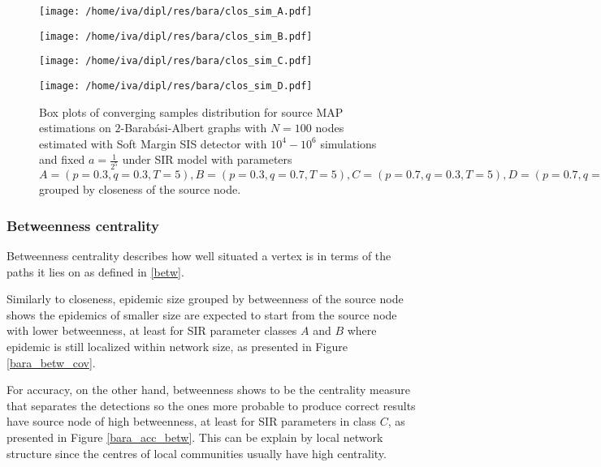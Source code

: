 \documentclass[times, utf8, diplomski]{fer}
\begin{document}
\begin{figure}[H]
\begin{minipage}{0.5\textwidth}
\texttt{[image: /home/iva/dipl/res/bara/clos\_sim\_A.pdf]}
\end{minipage}
\begin{minipage}{0.5\textwidth}
\texttt{[image: /home/iva/dipl/res/bara/clos\_sim\_B.pdf]}
\end{minipage}
\begin{minipage}{0.5\textwidth}
\texttt{[image: /home/iva/dipl/res/bara/clos\_sim\_C.pdf]}
\end{minipage}
\begin{minipage}{0.5\textwidth}
\texttt{[image: /home/iva/dipl/res/bara/clos\_sim\_D.pdf]}
\end{minipage}
\caption{Box plots of converging samples distribution for source MAP estimations  on  $2$-Barab\'{a}si-Albert graphs  with $N=100$ nodes estimated with Soft Margin SIS detector with $10^4 - 10^6$ simulations and fixed $a = \frac{1}{2^5}$ under SIR model with parameters $A = (p=0.3, q=0.3, T=5), B = (p=0.3, q=0.7, T=5), C = (p=0.7, q=0.3, T=5), D = (p=0.7, q=0.7, T=5)$ grouped by closeness of the source node.}
\label{bara_sim_clos}
\end{figure}

\subsubsection{Betweenness centrality}

Betweenness centrality describes how well situated a vertex is in terms of the paths it lies on as defined in \ref{betw}. 

Similarly to closeness, epidemic size grouped by betweenness of the source node shows the epidemics of smaller size are expected to start from the source node with lower betweenness, at least for SIR parameter classes $A$ and $B$ where epidemic is still localized within network size, as presented in Figure \ref{bara_betw_cov}.

For  accuracy, on the other hand, betweenness shows to be the centrality measure that separates the detections so the ones more probable to produce correct results have source node of high betweenness, at least for SIR parameters in class $C$, as presented in Figure \ref{bara_acc_betw}. This can be explain by  local network structure since the centres of  local communities usually have high centrality.  
\end{document}
